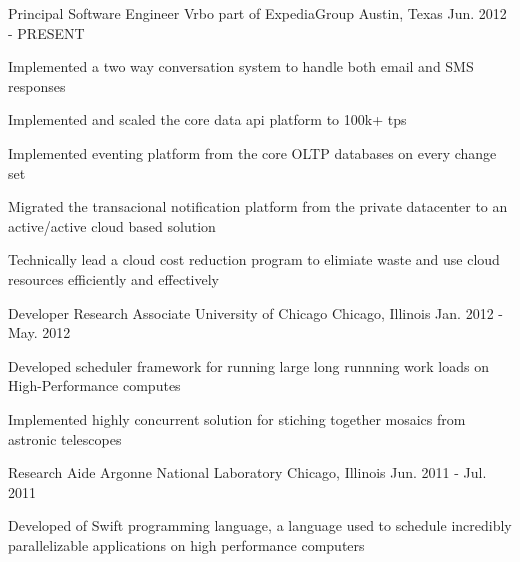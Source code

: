 


\begin{cventries}


\cventry
{Principal Software Engineer} %
{Vrbo part of ExpediaGroup} %
{Austin, Texas} %
{Jun. 2012 - PRESENT} %
{ %
\begin{cvitems}
\item {Implemented a two way conversation system to handle both email and SMS responses}
\item {Implemented and scaled the core data api platform to 100k+ tps}
\item {Implemented eventing platform from the core OLTP databases on every change set}
\item {Migrated the transacional notification platform from the private datacenter to an active/active cloud based solution}
\item {Technically lead a cloud cost reduction program to elimiate waste and use cloud resources efficiently and effectively}
\end{cvitems}
}


\cventry
{Developer Research Associate} %
{University of Chicago} %
{Chicago, Illinois} %
{Jan. 2012 - May. 2012} %
{ %
\begin{cvitems}
\item {Developed scheduler framework for running large long runnning work loads on High-Performance computes}
\item {Implemented highly concurrent solution for stiching together mosaics from astronic telescopes}
\end{cvitems}
}



\cventry
{Research Aide} %
{Argonne National Laboratory} %
{Chicago, Illinois} %
{Jun. 2011 - Jul. 2011} %
{ %
\begin{cvitems}
\item {Developed of Swift programming language, a language used to schedule incredibly parallelizable applications on high performance computers}
\end{cvitems}
}


\end{cventries}